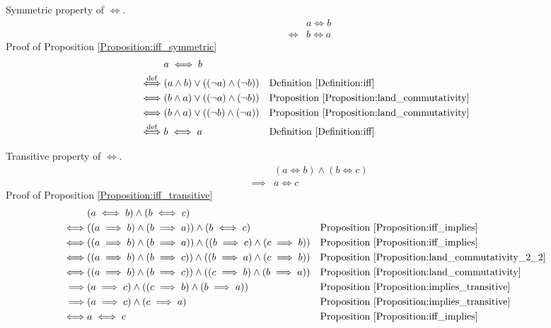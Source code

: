 \begin{prop}
\label{Proposition:iff_symmetric}
Symmetric property of $\iff$.
\begin{align*}
& a \iff b \\
\iff & b \iff a
\end{align*}
Proof of Proposition \ref{Proposition:iff_symmetric}
\begin{align*}
& a \iff b \\
\overset{\operatorname{def}}{\iff} & (a \land b) \lor ((\lnot a) \land (\lnot b))
& & \text{Definition \ref{Definition:iff}} \\
\iff & (b \land a) \lor ((\lnot a) \land (\lnot b))
& & \text{Proposition \ref{Proposition:land_commutativity}} \\
\iff & (b \land a) \lor ((\lnot b) \land (\lnot a))
& & \text{Proposition \ref{Proposition:land_commutativity}} \\
\overset{\operatorname{def}}{\iff} & b \iff a
& & \text{Definition \ref{Definition:iff}} \\
\end{align*}
\end{prop}

\begin{prop}
\label{Proposition:iff_transitive}
Transitive property of $\iff$.
\begin{align*}
& (a \iff b) \land (b \iff c) \\
\implies & a \iff c
\end{align*}
Proof of Proposition \ref{Proposition:iff_transitive}
\begin{align*}
& (a \iff b) \land (b \iff c) \\
\iff & ((a \implies b) \land (b \implies a)) \land (b \iff c)
& & \text{Proposition \ref{Proposition:iff_implies}} \\
\iff & ((a \implies b) \land (b \implies a)) \land ((b \implies c) \land (c \implies b))
& & \text{Proposition \ref{Proposition:iff_implies}} \\
\iff & ((a \implies b) \land (b \implies c)) \land ((b \implies a) \land (c \implies b))
& & \text{Proposition \ref{Proposition:land_commutativity_2_2}} \\
\iff & ((a \implies b) \land (b \implies c)) \land ((c \implies b) \land (b \implies a))
& & \text{Proposition \ref{Proposition:land_commutativity}} \\
\implies & (a \implies c) \land ((c \implies b) \land (b \implies a))
& & \text{Proposition \ref{Proposition:implies_transitive}} \\
\implies & (a \implies c) \land (c \implies a)
& & \text{Proposition \ref{Proposition:implies_transitive}} \\
\iff & a \iff c
& & \text{Proposition \ref{Proposition:iff_implies}} \\
\end{align*}
\end{prop}

